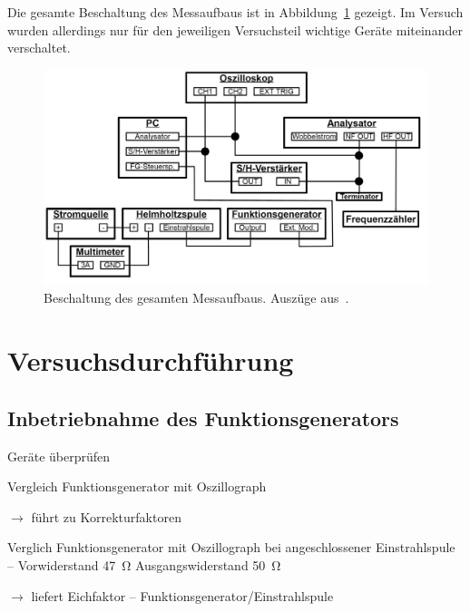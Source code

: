 \documentclass[paper=a4,
	fontsize=10pt,
	DIV=18,
	twocolumn,
	parskip=half
	]{scrartcl}
\numberwithin{equation}{section}    %
\newcommand{\tra}{$\rightarrow $}
\begin{document}
Die gesamte Beschaltung des Messaufbaus ist in Abbildung~\ref{fig.beschaltung} gezeigt. Im Versuch wurden allerdings nur für den jeweiligen Versuchsteil wichtige Geräte miteinander verschaltet.

\begin{figure}[htp]
	\includegraphics[width=\columnwidth]{Bilder/messbeschaltung.pdf}
	\caption{Beschaltung des gesamten Messaufbaus. Auszüge aus~\citet{anleitung}.}
	\label{fig.beschaltung}
\end{figure}


\section{Versuchsdurchführung}
\label{durchfuehrung}
%
\subsection{Inbetriebnahme des Funktionsgenerators}
\label{vorbereitung1}

\begin{compactitem}
	\item Geräte überprüfen
	\item Vergleich Funktionsgenerator mit Oszillograph
	\item[\tra] führt zu Korrekturfaktoren
	\item Verglich Funktionsgenerator mit Oszillograph bei angeschlossener Einstrahlspule \--- Vorwiderstand \SI{47}{\ohm} Ausgangswiderstand \SI{50}{\ohm}
	\item[\tra] liefert Eichfaktor \--- Funktionsgenerator/Einstrahlspule
\end{compactitem}
\end{document}
